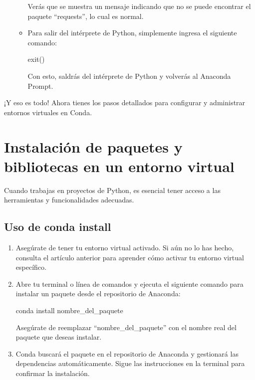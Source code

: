 \documentclass[
  jou,
  floatsintext,
  longtable,
  a4paper,
  nolmodern,
  notxfonts,
  notimes,
  colorlinks=true,linkcolor=blue,citecolor=blue,urlcolor=blue]{apa7}
\newenvironment{Shaded}{\begin{snugshade}}{\end{snugshade}}
\newcommand{\ExtensionTok}[1]{\textcolor[rgb]{0.00,0.23,0.31}{#1}}
\newcommand{\NormalTok}[1]{\textcolor[rgb]{0.00,0.23,0.31}{#1}}
\begin{document}
\begin{enumerate}
\begin{itemize}
    Verás que se muestra un mensaje indicando que no se puede encontrar
    el paquete ``requests'', lo cual es normal.
  \item
    Para salir del intérprete de Python, simplemente ingresa el
    siguiente comando:

\begin{Shaded}
\begin{Highlighting}[]
\NormalTok{exit()}
\end{Highlighting}
\end{Shaded}

    Con esto, saldrás del intérprete de Python y volverás al Anaconda
    Prompt.
  \end{itemize}
\end{enumerate}

¡Y eso es todo! Ahora tienes los pasos detallados para configurar y
administrar entornos virtuales en Conda.

\section{Instalación de paquetes y bibliotecas en un entorno
virtual}\label{instalaciuxf3n-de-paquetes-y-bibliotecas-en-un-entorno-virtual}

Cuando trabajas en proyectos de Python, es esencial tener acceso a las
herramientas y funcionalidades adecuadas.

\subsection{Uso de conda install}\label{uso-de-conda-install}

\begin{enumerate}
\def\labelenumi{\arabic{enumi}.}
\item
  Asegúrate de tener tu entorno virtual activado. Si aún no lo has
  hecho, consulta el artículo anterior para aprender cómo activar tu
  entorno virtual específico.
\item
  Abre tu terminal o línea de comandos y ejecuta el siguiente comando
  para instalar un paquete desde el repositorio de Anaconda:

\begin{Shaded}
\begin{Highlighting}[]
\ExtensionTok{conda}\NormalTok{ install nombre\_del\_paquete}
\end{Highlighting}
\end{Shaded}

  Asegúrate de reemplazar ``nombre\_del\_paquete'' con el nombre real
  del paquete que deseas instalar.
\item
  Conda buscará el paquete en el repositorio de Anaconda y gestionará
  las dependencias automáticamente. Sigue las instrucciones en la
  terminal para confirmar la instalación.
\end{enumerate}
\end{document}
